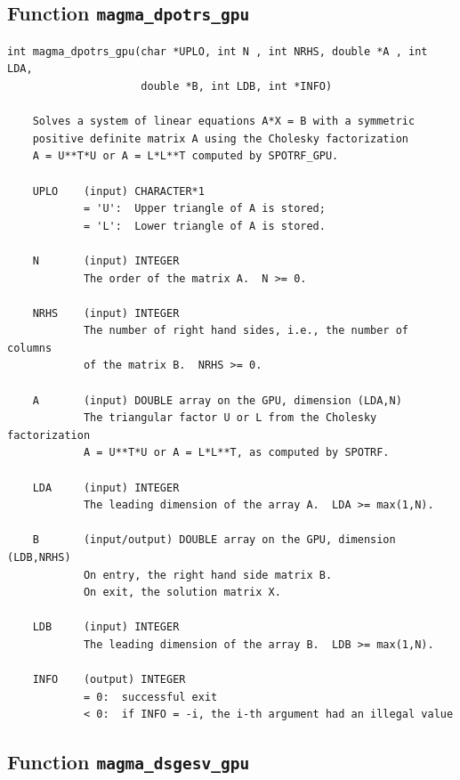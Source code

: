 \documentclass[10pt]{book}
\begin{document}
\newpage
\subsection{Function {\tt {\bf magma\_dpotrs\_gpu}}}
\begin{verbatim}
int magma_dpotrs_gpu(char *UPLO, int N , int NRHS, double *A , int LDA,
                     double *B, int LDB, int *INFO)

    Solves a system of linear equations A*X = B with a symmetric
    positive definite matrix A using the Cholesky factorization
    A = U**T*U or A = L*L**T computed by SPOTRF_GPU.

    UPLO    (input) CHARACTER*1
            = 'U':  Upper triangle of A is stored;
            = 'L':  Lower triangle of A is stored.

    N       (input) INTEGER
            The order of the matrix A.  N >= 0.

    NRHS    (input) INTEGER
            The number of right hand sides, i.e., the number of columns
            of the matrix B.  NRHS >= 0.

    A       (input) DOUBLE array on the GPU, dimension (LDA,N)
            The triangular factor U or L from the Cholesky factorization
            A = U**T*U or A = L*L**T, as computed by SPOTRF.

    LDA     (input) INTEGER
            The leading dimension of the array A.  LDA >= max(1,N).

    B       (input/output) DOUBLE array on the GPU, dimension (LDB,NRHS)
            On entry, the right hand side matrix B.
            On exit, the solution matrix X.

    LDB     (input) INTEGER
            The leading dimension of the array B.  LDB >= max(1,N).

    INFO    (output) INTEGER
            = 0:  successful exit
            < 0:  if INFO = -i, the i-th argument had an illegal value
\end{verbatim}


\newpage
\subsection{Function {\tt {\bf magma\_dsgesv\_gpu}}}
\begin{verbatim}
\end{verbatim}
\end{document}
